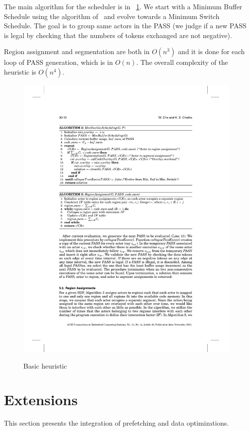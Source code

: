 \documentclass{article}
\begin{document}
The main algorithm for the scheduler is in \figurename~\ref{algo2}.
We start with a Minimum Buffer Schedule using the algorithm of~\cite{jantsch2004modeling} and evolve towards a Minimum Switch Schedule.
The goal is to group same actors in the PASS (we judge if a new PASS is legal by checking that the numbers of tokens exchanged are not negative).

Region assignment and segmentation are both in $O(n^3)$ and it is done for each loop of PASS generation, which is in $O(n)$.
The overall complexity of the heuristic is $O(n^4)$.

\begin{figure}
\caption{Basic heuristic}
\centering
\includegraphics[scale=0.92]{algo2}
\label{algo2}
\end{figure}


\section{Extensions}
\label{extensions}
This section presents the integration of prefetching and data optimizations.
\end{document}
